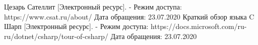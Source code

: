 \newpage

\begin{thebibliography}{}
	 Цезарь Сателлит [Электронный ресурс]. -
	Режим доступа: https://www.csat.ru/about/
	Дата обращения: 23.07.2020
	 Краткий обзор языка C Шарп [Электронный ресурс]. -
	Режим доступа: https://docs.microsoft.com/ru-ru/dotnet/csharp/tour-of-csharp/
	Дата обращения: 23.07.2020
\end{thebibliography}